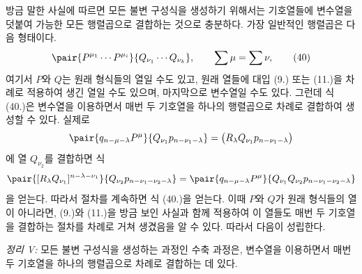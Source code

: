 
방금 말한 사실에 따르면 모든 불변 구성식을 생성하기 위해서는 기호열들에 변수열을 덧붙여 가능한 모든 행렬곱으로 결합하는 것으로 충분하다. 가장 일반적인 행렬곱은 다음 형태이다.
\begin{equation}
 \pair{P^{\mu_1}\cdots P^{\mu_i}}{Q_{\nu_1}\cdots Q_{\nu_k}},\qquad \sum\mu=\sum\nu,
\tag{40}
\end{equation}
여기서 $P$와 $Q$는 원래 형식들의 열일 수도 있고, 원래 열들에 대입 (9.) 또는 (11.)을 차례로 적용하여 생긴 열일 수도 있으며, 마지막으로 변수열일 수도 있다. 그런데 식 (40.)은 변수열을 이용하면서 매번 두 기호열을 하나의 행렬곱으로 차례로 결합하여 생성할 수 있다. 실제로
\[
 \pair{q_{n-\mu-\lambda}P^\mu}{Q_{\nu_1}p_{n-\nu_1-\lambda}}
 =\bigl(R_\lambda Q_{\nu_1}p_{n-\nu_1-\lambda}\bigr)
\]
에 열 $Q_{\nu_2}$를 결합하면 식
\[
 \pair{[R_\lambda Q_{\nu_1}]^{n-\lambda-\nu_1}}{Q_{\nu_2}p_{n-\nu_1-\nu_2-\lambda}}
 =\pair{q_{n-\mu-\lambda}P^\mu}{Q_{\nu_1}Q_{\nu_2}p_{n-\nu_1-\nu_2-\lambda}}
\]
을 얻는다. 따라서 절차를 계속하면 식 (40.)을 얻는다. 이때 $P$와 $Q$가 원래 형식들의 열이 아니라면, (9.)와 (11.)을 방금 보인 사실과 함께 적용하여 이 열들도 매번 두 기호열을 결합하는 절차를 차례로 거쳐 생겼음을 알 수 있다. 따라서 다음이 성립한다.

\emph{정리 V:} 모든 불변 구성식을 생성하는 과정인 수축 과정은, 변수열을 이용하면서 매번 두 기호열을 하나의 행렬곱으로 차례로 결합하는 데 있다.
